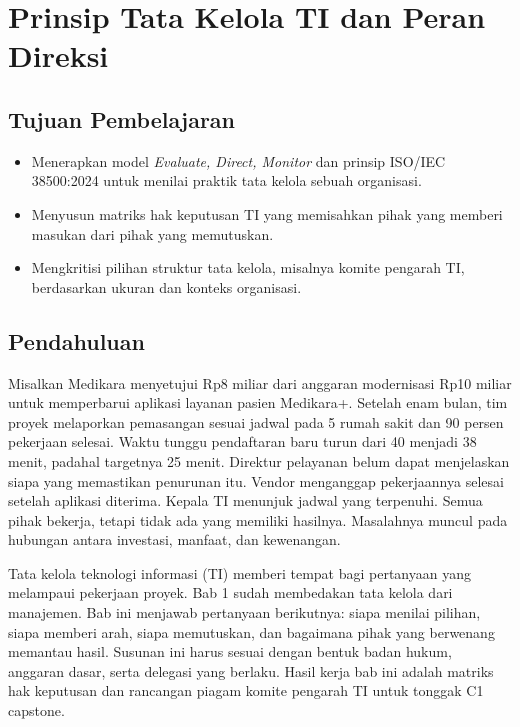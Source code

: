\chapter{Prinsip Tata Kelola TI dan Peran Direksi}

\section*{Tujuan Pembelajaran}
\begin{itemize}
  \item Menerapkan model \textit{Evaluate, Direct, Monitor} dan prinsip ISO/IEC
  38500:2024 untuk menilai praktik tata kelola sebuah organisasi.
  \item Menyusun matriks hak keputusan TI yang memisahkan pihak yang memberi masukan
  dari pihak yang memutuskan.
  \item Mengkritisi pilihan struktur tata kelola, misalnya komite pengarah TI,
  berdasarkan ukuran dan konteks organisasi.
\end{itemize}

\section{Pendahuluan}

Misalkan Medikara menyetujui Rp8 miliar dari anggaran modernisasi Rp10 miliar untuk
memperbarui aplikasi layanan pasien Medikara+. Setelah enam bulan, tim proyek melaporkan
pemasangan sesuai jadwal pada 5 rumah sakit dan 90 persen pekerjaan selesai. Waktu tunggu
pendaftaran baru turun dari 40 menjadi 38 menit, padahal targetnya 25 menit. Direktur
pelayanan belum dapat menjelaskan siapa yang memastikan penurunan itu. Vendor menganggap
pekerjaannya selesai setelah aplikasi diterima. Kepala TI menunjuk jadwal yang terpenuhi.
Semua pihak bekerja, tetapi tidak ada yang memiliki hasilnya. Masalahnya muncul pada
hubungan antara investasi, manfaat, dan kewenangan.

Tata kelola teknologi informasi (TI) memberi tempat bagi pertanyaan yang melampaui
pekerjaan proyek. Bab 1 sudah membedakan tata kelola dari manajemen. Bab ini menjawab
pertanyaan berikutnya: siapa menilai pilihan, siapa memberi arah, siapa memutuskan, dan
bagaimana pihak yang berwenang memantau hasil. Susunan ini harus sesuai dengan bentuk
badan hukum, anggaran dasar, serta delegasi yang berlaku. Hasil kerja bab ini adalah
matriks hak keputusan dan rancangan piagam komite pengarah TI untuk tonggak C1 capstone.

